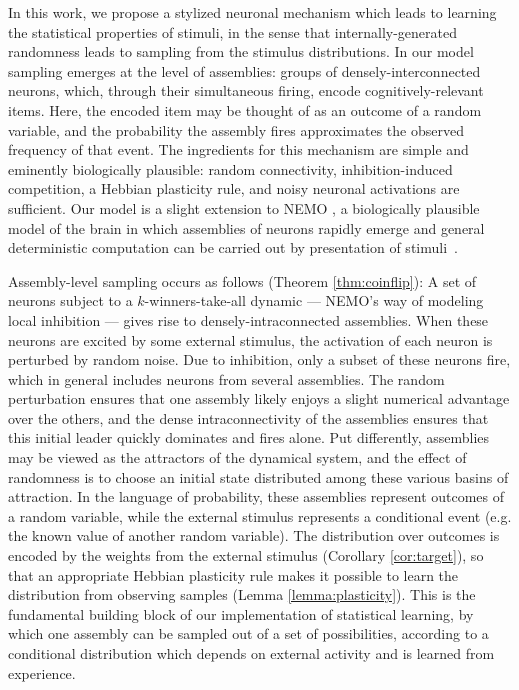 \documentclass{article}
\theoremstyle{remark}
\newcommand{\1}{\mathbbm{1}}
\begin{document}
In this work, we propose a stylized neuronal mechanism which leads to learning the statistical properties of stimuli, in the sense that internally-generated randomness leads to sampling from the stimulus distributions. In our model sampling emerges at the level of assemblies: groups of densely-interconnected neurons, which, through their simultaneous firing, encode cognitively-relevant items. Here, the encoded item may be thought of as an outcome of a random variable, and the probability the assembly fires approximates the observed frequency of that event. The ingredients for this mechanism are simple and eminently biologically plausible: random connectivity, inhibition-induced competition, a Hebbian plasticity rule, and noisy neuronal activations are sufficient. Our model is a slight extension to NEMO \cite{papadimitriou2020brain}, a biologically plausible model of the brain in which assemblies of neurons rapidly emerge and general deterministic computation can be carried out by presentation of stimuli~\cite{dabagia2024computation}.

Assembly-level sampling occurs as follows (Theorem \ref{thm:coinflip}): A set of neurons subject to a $k$-winners-take-all dynamic --- NEMO's way of modeling local inhibition --- gives rise to densely-intraconnected assemblies. When these neurons are excited by some external stimulus, the activation of each neuron is perturbed by random noise. Due to inhibition, only a subset of these neurons fire, which in general includes neurons from several assemblies. The random perturbation ensures that one assembly likely enjoys a slight numerical advantage over the others, and the dense intraconnectivity of the assemblies ensures that this initial leader quickly dominates and fires alone. Put differently, assemblies may be viewed as the attractors of the dynamical system, and the effect of randomness is to choose an initial state distributed among these various basins of attraction. In the language of probability, these assemblies represent outcomes of a random variable, while the external stimulus represents a conditional event (e.g. the known value of another random variable). The distribution over outcomes is encoded by the weights from the external stimulus (Corollary \ref{cor:target}), so that an appropriate Hebbian plasticity rule makes it possible to learn the distribution from observing samples (Lemma \ref{lemma:plasticity}).
This is the fundamental building block of our implementation of statistical learning, by which one assembly can be sampled out of a set of possibilities, according to a conditional distribution which depends on external activity and is learned from experience.
\end{document}
